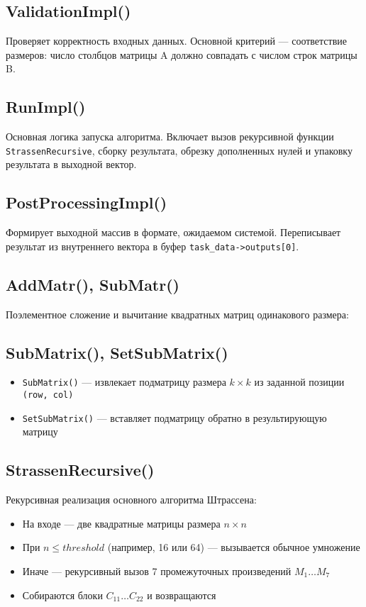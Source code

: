 \documentclass[12pt]{article}
\begin{document}
\subsection*{ValidationImpl()}
Проверяет корректность входных данных. Основной критерий — соответствие размеров: число столбцов матрицы A должно совпадать с числом строк матрицы B.

\subsection*{RunImpl()}
Основная логика запуска алгоритма. Включает вызов рекурсивной функции \texttt{StrassenRecursive}, сборку результата, обрезку дополненных нулей и упаковку результата в выходной вектор.

\subsection*{PostProcessingImpl()}
Формирует выходной массив в формате, ожидаемом системой. Переписывает результат из внутреннего вектора в буфер \texttt{task\_data->outputs[0]}.

\subsection*{AddMatr(), SubMatr()}
Поэлементное сложение и вычитание квадратных матриц одинакового размера:

\subsection*{SubMatrix(), SetSubMatrix()}
\begin{itemize}
  \item \texttt{SubMatrix()} — извлекает подматрицу размера $k \times k$ из заданной позиции \texttt{(row, col)}
  \item \texttt{SetSubMatrix()} — вставляет подматрицу обратно в результирующую матрицу
\end{itemize}

\subsection*{StrassenRecursive()}
Рекурсивная реализация основного алгоритма Штрассена:
\begin{itemize}
  \item На входе — две квадратные матрицы размера $n \times n$
  \item При $n \leq threshold$ (например, 16 или 64) — вызывается обычное умножение
  \item Иначе — рекурсивный вызов 7 промежуточных произведений $M_1 \dots M_7$
  \item Собираются блоки $C_{11} \dots C_{22}$ и возвращаются
\end{itemize}
\end{document}
